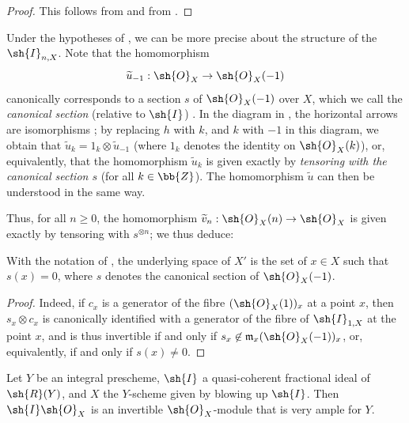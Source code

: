 \begin{proof}
This follows from  and from .
\end{proof}

\begin{env}[8.1.9]
\label{II.8.1.9}
Under the hypotheses of , we can be more precise about the structure of the $\sh{I}_{n,X}$.
Note that the homomorphism
\[
  \widetilde{u}_{-1}: \sh{O}_X \to \sh{O}_X(-1)
\]
canonically corresponds to a section $s$ of $\sh{O}_X(-1)$ over $X$, which we call the \emph{canonical section} (relative to $\sh{I}$) .
In the diagram in , the horizontal arrows are isomorphisms ; by replacing $h$ with $k$, and $k$ with $-1$ in this diagram, we obtain that $\widetilde{u}_k = 1_k \otimes \widetilde{u}_{-1}$ (where $1_k$ denotes the identity on $\sh{O}_X(k)$), or, equivalently, that the homomorphism $\widetilde{u}_k$ is given exactly by \emph{tensoring with the canonical section $s$} (for all $k\in\bb{Z}$).
The homomorphism $\widetilde{u}$  can then be understood in the same way.

Thus, for all $n\geq0$, the homomorphism $\widetilde{v}_n: \sh{O}_X(n)\to\sh{O}_X$ is given exactly by tensoring with $s^{\otimes n}$;
we thus deduce:
\end{env}

\begin{corollary}[8.1.10]
\label{II.8.1.10}
With the notation of , the underlying space of $X'$ is the set of $x\in X$ such that $s(x)=0$, where $s$ denotes the canonical section of $\sh{O}_X(-1)$.
\end{corollary}

\begin{proof}
Indeed, if $c_x$ is a generator of the fibre $(\sh{O}_X(1))_x$ at a point $x$, then $s_x\otimes c_x$ is canonically identified with a generator of the fibre of $\sh{I}_{1,X}$ at the point $x$, and is thus invertible if and only if $s_x\not\in\mathfrak{m}_x(\sh{O}_X(-1))_x$, or, equivalently, if and only if $s(x)\neq0$.
\end{proof}

\begin{proposition}[8.1.11]
\label{II.8.1.11}
Let $Y$ be an integral prescheme, $\sh{I}$ a quasi-coherent fractional ideal of $\sh{R}(Y)$, and $X$ the $Y$-scheme given by blowing up $\sh{I}$.
Then $\sh{I}\sh{O}_X$ is an invertible $\sh{O}_X$-module that is very ample for $Y$.
\end{proposition}

